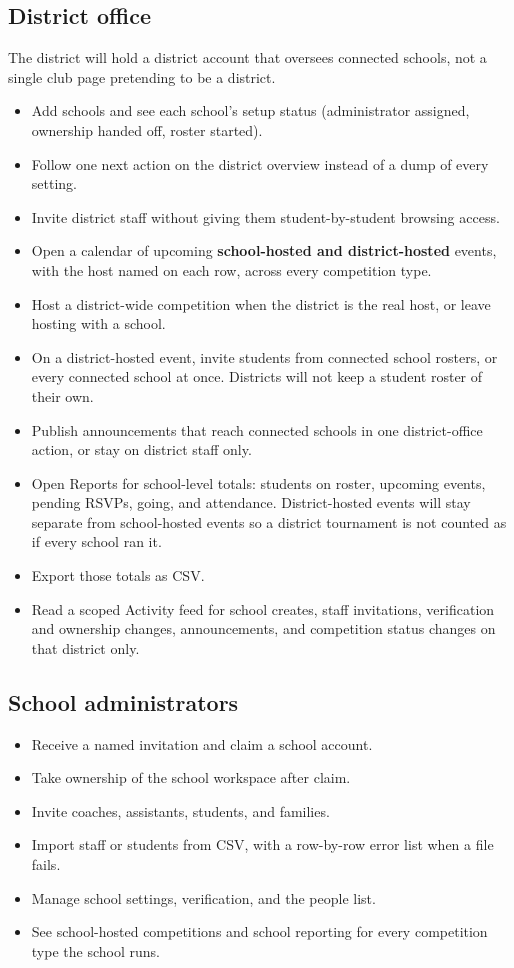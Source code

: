 \documentclass[11pt]{article}
\begin{document}
\subsection*{District office}
The district will hold a district account that oversees connected schools, not a single club page pretending to be a district.

\begin{itemize}
  \item Add schools and see each school's setup status (administrator assigned, ownership handed off, roster started).
  \item Follow one next action on the district overview instead of a dump of every setting.
  \item Invite district staff without giving them student-by-student browsing access.
  \item Open a calendar of upcoming \textbf{school-hosted and district-hosted} events, with the host named on each row, across every competition type.
  \item Host a district-wide competition when the district is the real host, or leave hosting with a school.
  \item On a district-hosted event, invite students from connected school rosters, or every connected school at once. Districts will not keep a student roster of their own.
  \item Publish announcements that reach connected schools in one district-office action, or stay on district staff only.
  \item Open Reports for school-level totals: students on roster, upcoming events, pending RSVPs, going, and attendance. District-hosted events will stay separate from school-hosted events so a district tournament is not counted as if every school ran it.
  \item Export those totals as CSV.
  \item Read a scoped Activity feed for school creates, staff invitations, verification and ownership changes, announcements, and competition status changes on that district only.
\end{itemize}

\subsection*{School administrators}
\begin{itemize}
  \item Receive a named invitation and claim a school account.
  \item Take ownership of the school workspace after claim.
  \item Invite coaches, assistants, students, and families.
  \item Import staff or students from CSV, with a row-by-row error list when a file fails.
  \item Manage school settings, verification, and the people list.
  \item See school-hosted competitions and school reporting for every competition type the school runs.
\end{itemize}
\end{document}
